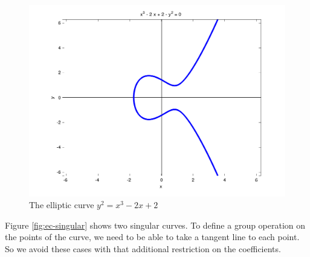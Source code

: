 \documentclass{article}
\begin{document}
\begin{figure}[h]
\centering
\includegraphics[width=\textwidth]{images/ec4g.png}
\caption{The elliptic curve $y^2 = x^3 - 2x + 2$}
\label{fig:ec-plot2}
\end{figure}

Figure \ref{fig:ec-singular} shows two singular curves.
To define a group operation on the points of the curve, we need to be able to take a tangent line to each point.
So we avoid these cases with that additional restriction on the coefficients.
\end{document}
